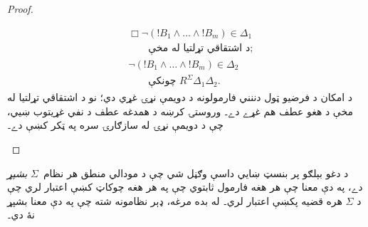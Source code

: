 \documentclass[../../../include/open-logic-section]{subfiles}
\begin{document}
\begin{proof}
\begin{enumerate}
\begin{align*}
      & \Box\lnot (!B_1 \land \dots \land !B_m) \in \Delta_1\\
      &\qquad\text{د اشتقاقي تړلتيا له مخې}; \\
      & \lnot (!B_1 \land \dots \land !B_m) \in \Delta_2\\
      &\qquad \text{چونکې }
      R^\Sigma \Delta_1\Delta_2.
    \end{align*}
    د امکان د فرضيو ټول دننني فارمولونه د دويمې نړۍ غړي دي؛
    نو د اشتقاقي تړلتيا له مخې د هغو عطف هم غړے دے۔ وروستۍ
    کرښه د همدغه عطف د نفي غړيتوب ښيي، چې د دويمې نړۍ له
    سازګارۍ سره په ټکر کښې دے۔
  \end{enumerate}
\end{proof}

د دغو بېلګو پر بنسټ ښايي داسې وګڼل شي چې د مودالي منطق هر
نظام~$\Sigma$ \emph{بشپړ} دے، په دې معنا چې هر هغه فارمول ثابتوي چې په هر
هغه چوکاټ کښې اعتبار لري چې د $\Sigma$ هره قضيه پکښې اعتبار لري۔
له بده مرغه، ډېر نظامونه شته چې په دې معنا بشپړ نۀ دي۔
\end{document}
